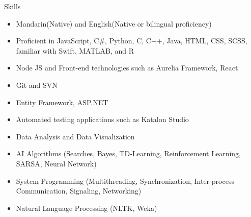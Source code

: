 \documentclass{resume}
\begin{document}
\begin{rSection}{Skills}

\begin{itemize}
    \item   Mandarin(Native) and English(Native or bilingual proficiency)
    \item	Proficient in JavaScript, C\#, Python, C, C++, Java, HTML, CSS, SCSS, familiar with Swift, MATLAB, and R
    \item	Node JS and Front-end technologies such as Aurelia Framework, React
    \item   Git and SVN
    \item	Entity Framework, ASP.NET
    \item	Automated testing applications such as Katalon Studio	
    \item   Data Analysis and Data Visualization
    \item	AI Algorithms (Searches, Bayes, TD-Learning, Reinforcement Learning, SARSA, Neural Network)
    \item	System Programming (Multithreading, Synchronization, Inter-process Communication, Signaling, Networking)
    \item	Natural Language Processing (NLTK, Weka)
\end{itemize}

\end{rSection}
\end{document}
